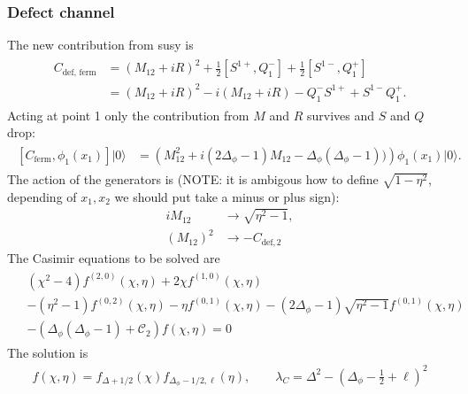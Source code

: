 \documentclass[letterpaper]{article}
\let\Oldsubsubsection\subsubsection
\renewcommand{\subsubsection}{\FloatBarrier\Oldsubsubsection}
\begin{document}
\subsubsection{Defect channel}

The new contribution from susy is
\begin{align}
\begin{split}
 C_{\text{def, ferm}} 
 & = 
    (M_{12} + iR)^2
  + \frac12 [ S^{1+}, Q^-_1]
  + \frac12 [ S^{1-}, Q^+_1] \\
 & =
     (M_{12} + i R)^2
  -i (M_{12} + i R)
  - Q^-_1 S^{1+}
  + S^{1-} Q^+_1.
\end{split}
\end{align}
Acting at point 1 only the contribution from $M$ and $R$ survives and $S$ and $Q$ drop:
\begin{align}
\begin{split}
 [C_{\text{ferm}}, \phi_1(x_1) ] |0\rangle
 & = \left(   
      M_{12}^2 
    + i (2\Delta_\phi -1) M_{12}
    - \Delta_\phi(\Delta_\phi -1) ) 
 \right) \phi_1(x_1) |0\rangle.
\end{split}
\end{align}
The action of the generators is (NOTE: it is ambigous how to define $\sqrt{1-\eta^2}$, depending of $x_1, x_2$ we should put take a minus or plus sign):
\begin{align}
 i M_{12}   & \to \sqrt{\eta^2-1}, \\
 (M_{12})^2 & \to - C_{\text{def},2}
\end{align}
The Casimir equations to be solved are
\begin{align}
\begin{split}
& (\chi^2 - 4) f^{(2,0)}(\chi, \eta) 
  + 2 \chi f^{(1,0)}(\chi, \eta) \\
& - (\eta^2 - 1) f^{(0,2)}(\chi, \eta)
  - \eta f^{(0,1)}(\chi, \eta)
  - (2\Delta_\phi - 1) \sqrt{\eta^2 -1 } f^{(0,1)}(\chi, \eta) \\
& - \left( \Delta_\phi(\Delta_\phi - 1)
  + \mathcal{C}_2 \right) f(\chi, \eta) = 0
\end{split}
\end{align}
The solution is
\begin{align}
 f(\chi, \eta) 
 = f_{\Delta+1/2}(\chi) f_{\Delta_\phi-1/2,\ell}(\eta), \qquad
 \lambda_C = \Delta^2 - \left(\Delta_\phi - \frac{1}{2} + \ell \right)^2
\end{align}
\end{document}
